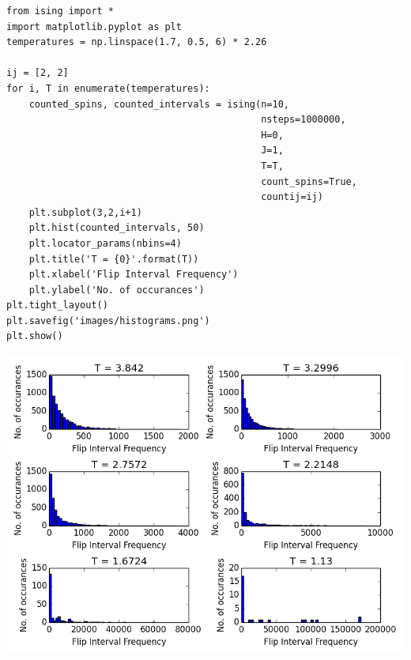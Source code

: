 \documentclass{article}
\begin{document}
\begin{verbatim}
from ising import *
import matplotlib.pyplot as plt
temperatures = np.linspace(1.7, 0.5, 6) * 2.26

ij = [2, 2]
for i, T in enumerate(temperatures):
    counted_spins, counted_intervals = ising(n=10,
                                             nsteps=1000000,
                                             H=0,
                                             J=1,
                                             T=T, 
                                             count_spins=True,
                                             countij=ij)
    plt.subplot(3,2,i+1)
    plt.hist(counted_intervals, 50)
    plt.locator_params(nbins=4)
    plt.title('T = {0}'.format(T))
    plt.xlabel('Flip Interval Frequency')
    plt.ylabel('No. of occurances')
plt.tight_layout()
plt.savefig('images/histograms.png')
plt.show()
\end{verbatim}

\includegraphics[width=.9\linewidth]{./images/histograms.png}
\end{document}
